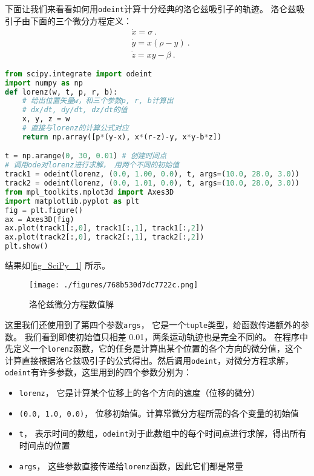 下面让我们来看看如何用\verb`odeint`计算十分经典的洛仑兹吸引子的轨迹。 洛仑兹吸引子由下面的三个微分方程定义：
\begin{align}
&\dot{x}=\sigma~.\\
&\dot{y}=x(\rho-y)~.\\
&\dot{z}=xy-\beta~.
\end{align}

\begin{lstlisting}[language=python]
from scipy.integrate import odeint
import numpy as np
def lorenz(w, t, p, r, b):
    # 给出位置矢量w，和三个参数p, r, b计算出
    # dx/dt, dy/dt, dz/dt的值
    x, y, z = w
    # 直接与lorenz的计算公式对应
    return np.array([p*(y-x), x*(r-z)-y, x*y-b*z])

t = np.arange(0, 30, 0.01) # 创建时间点
# 调用ode对lorenz进行求解， 用两个不同的初始值
track1 = odeint(lorenz, (0.0, 1.00, 0.0), t, args=(10.0, 28.0, 3.0))
track2 = odeint(lorenz, (0.0, 1.01, 0.0), t, args=(10.0, 28.0, 3.0))
from mpl_toolkits.mplot3d import Axes3D
import matplotlib.pyplot as plt
fig = plt.figure()
ax = Axes3D(fig)
ax.plot(track1[:,0], track1[:,1], track1[:,2])
ax.plot(track2[:,0], track2[:,1], track2[:,2])
plt.show()
\end{lstlisting}
结果如\autoref{fig_SciPy_1} 所示。
\begin{figure}[ht]
\centering
\texttt{[image: ./figures/768b530d7dc7722c.png]}
\caption{洛伦兹微分方程数值解} \label{fig_SciPy_1}
\end{figure}
这里我们还使用到了第四个参数\verb`args`， 它是一个\verb`tuple`类型，给函数传递额外的参数。 我们看到即使初始值只相差 0.01，两条运动轨迹也是完全不同的。
在程序中先定义一个\verb`lorenz`函数，它的任务是计算出某个位置的各个方向的微分值，这个计算直接根据洛仑兹吸引子的公式得出。然后调用\verb`odeint`，对微分方程求解，\verb`odeint`有许多参数，这里用到的四个参数分别为：
\begin{itemize}
\item \verb`lorenz`， 它是计算某个位移上的各个方向的速度（位移的微分）
\item \verb`(0.0, 1.0, 0.0)`， 位移初始值。计算常微分方程所需的各个变量的初始值
\item \verb`t`， 表示时间的数组，\verb`odeint`对于此数组中的每个时间点进行求解，得出所有时间点的位置
\item \verb`args`， 这些参数直接传递给\verb`lorenz`函数，因此它们都是常量
\end{itemize}
